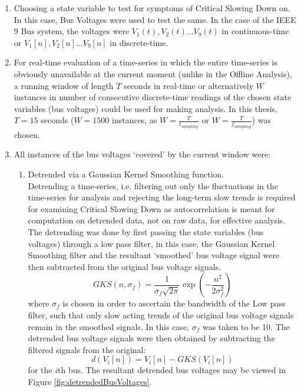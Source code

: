\begin{enumerate}
	\item Choosing a state variable to test for symptoms of Critical Slowing Down on. In this case, Bus Voltages were used to test the same. In the case of the IEEE 9 Bus system, the voltages were $V_1(t), V_2(t) \ldots V_9(t)$ in continuous-time or $V_1[n], V_2[n] \ldots V_9[n]$ in discrete-time.
	\item For real-time evaluation of a time-series in which the entire time-series is obviously unavailable at the current moment (unlike in the Offline Analysis), a running window of length $T$ seconds in real-time or alternatively $W$ instances in number of consecutive discrete-time readings of the chosen state variables (bus voltages) could be used for making analysis. In this thesis, $T=15$ seconds ($W=1500$ instances, as $W=\frac{T}{t_{sampling}}$ or $W=\frac{T}{f_{sampling}}$) was chosen.
	\item All instances of the bus voltages `covered' by the current window were:\\
		\begin{enumerate}
			\item Detrended via a Gaussian Kernel Smoothing function. \\
			Detrending a time-series, i.e. filtering out only the fluctuations in the time-series for analysis and rejecting the long-term slow trends is required for examining Critical Slowing Down as autocorrelation is meant for computation on detrended data, not on raw data, for effective analysis. The detrending was done by first passing the state variables (bus voltages) through a low pass filter, in this case, the Gaussian Kernel Smoothing filter and the resultant `smoothed' bus voltage signal were then subtracted from the original bus voltage signals.
			\begin{equation}
				GKS(n, \sigma_f) = \frac{1}{\sigma_f \sqrt{2\pi}}\exp{\left(-\frac{n^2}{2\sigma_f^2}\right)}
			\end{equation}
			where $\sigma_f$ is chosen in order to ascertain the bandwidth of the Low pass filter, such that only slow acting trends of the original bus voltage signals remain in the smoothed signals. In this case, $\sigma_f$ was taken to be 10.
			The detrended bus voltage signals were then obtained by subtracting the filtered signals from the original:
			\begin{equation}
				d(V_i[n]) = V_i[n] - GKS(V_i[n])
			\end{equation}
			\hspace{25pt} for the $i$th bus.
			The resultant detrended bus voltages may be viewed in Figure \ref{fig:detrendedBusVoltages}. 
			

\end{enumerate}
\end{enumerate}

